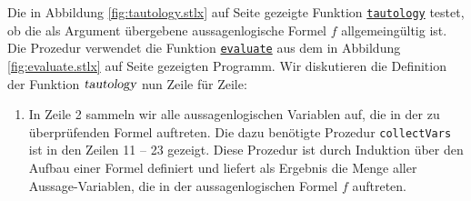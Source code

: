 \noindent
Die in Abbildung \ref{fig:tautology.stlx} auf Seite \pageref{fig:tautology.stlx}
gezeigte Funktion
\href{https://github.com/karlstroetmann/Logik/blob/master/SetlX/tautology.stlx}{\texttt{tautology}}
testet, ob die als Argument \"{u}bergebene
aussagenlogische Formel $f$ allgemeing\"{u}ltig ist.   
Die Prozedur verwendet die Funktion 
\href{https://github.com/karlstroetmann/Logik/blob/master/SetlX/evaluate.stlx}{\texttt{evaluate}}
aus dem in Abbildung
\ref{fig:evaluate.stlx} auf Seite \pageref{fig:evaluate.stlx} gezeigten Programm.
Wir diskutieren die Definition der Funktion $\textsl{tautology}$ nun Zeile f\"{u}r Zeile:
\begin{enumerate}
\item In Zeile 2 sammeln wir alle aussagenlogischen Variablen auf, die in der zu
      \"{u}berpr\"{u}fenden Formel auftreten.  Die dazu ben\"{o}tigte Prozedur \texttt{collectVars}
      ist in den Zeilen 11 -- 23 gezeigt.  Diese Prozedur ist durch Induktion \"{u}ber den
      Aufbau einer Formel definiert und liefert als Ergebnis die Menge aller Aussage-Variablen,
      die in der aussagenlogischen Formel $f$ auftreten.


\end{enumerate}
